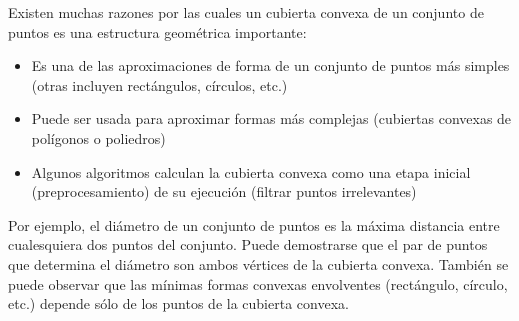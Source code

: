 Existen muchas razones por las cuales un cubierta convexa de un conjunto de puntos es una estructura geométrica importante:

\begin{itemize}
	\item Es una de las aproximaciones de forma de un conjunto de puntos más simples (otras incluyen rectángulos, círculos, etc.)
	\item Puede ser usada para aproximar formas más complejas (cubiertas convexas de polígonos o poliedros)
	\item Algunos algoritmos calculan la cubierta convexa como una etapa inicial (preprocesamiento) de su ejecución (filtrar puntos irrelevantes)
\end{itemize}

Por ejemplo, el diámetro de un conjunto de puntos es la máxima distancia entre cualesquiera dos puntos del conjunto. Puede demostrarse que el par de puntos que determina el diámetro son ambos vértices de la cubierta convexa. También se puede observar que las mínimas formas convexas envolventes (rectángulo, círculo, etc.) depende sólo de los puntos
de la cubierta convexa.